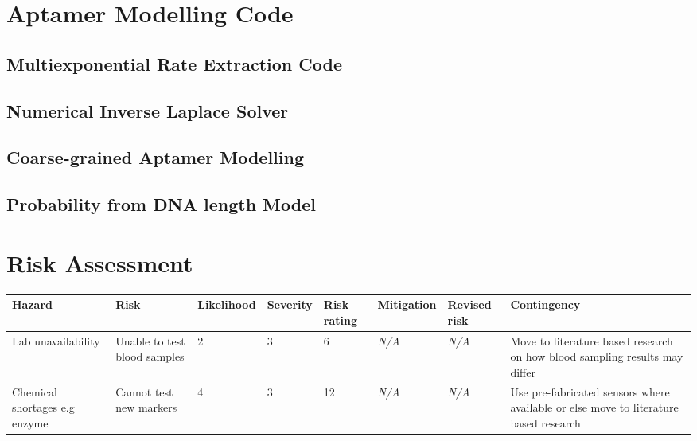 \begin{appendices}
\section{Aptamer Modelling Code} \label{app:apt_mod}
\subsection{Multiexponential Rate Extraction Code}

\newpage
\subsection{Numerical Inverse Laplace Solver}

\newpage
\subsection{Coarse-grained Aptamer Modelling}

\newpage
\subsection{Probability from DNA length Model}

\newpage

\section{Risk Assessment}
    \begin{longtable}{|p{}|p{}|p{}|p{}|p{}|p{}|p{}|p{}|}\hline
        \textbf{Hazard} & \textbf{Risk} & \textbf{Likelihood} & \textbf{Severity} & \textbf{Risk rating} & \textbf{Mitigation} & \textbf{Revised risk} & \textbf{Contingency }\\ \hline
        
        Lab unavailability & Unable to test blood samples & 2 & 3 & 6 & \textit{N/A} & \textit{N/A} & Move to literature based research on how blood sampling results may differ \\ \hline
        
        Chemical shortages e.g enzyme & Cannot test new markers & 4 & 3 & 12 & \textit{N/A} & \textit{N/A} & Use pre-fabricated sensors where available or else move to literature based research \\ \hline
        

\end{longtable}
\end{appendices}
